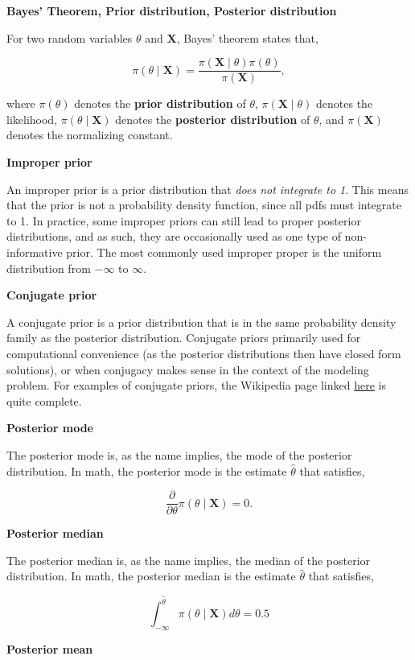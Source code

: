 \documentclass[
  letterpaper,
  DIV=11,
  numbers=noendperiod]{scrreprt}
\begin{document}
\textbf{Bayes' Theorem, Prior distribution, Posterior distribution}

For two random variables \(\theta\) and \(\textbf{X}\), Bayes' theorem
states that,

\[
\pi(\theta \mid \textbf{X}) = \frac{\pi(\textbf{X} \mid \theta)\pi(\theta)}{\pi(\textbf{X})},
\]

where \(\pi(\theta)\) denotes the \textbf{prior distribution} of
\(\theta\), \(\pi(\textbf{X} \mid \theta)\) denotes the likelihood,
\(\pi(\theta \mid \textbf{X})\) denotes the \textbf{posterior
distribution} of \(\theta\), and \(\pi(\textbf{X})\) denotes the
normalizing constant.

\textbf{Improper prior}

An improper prior is a prior distribution that \emph{does not integrate
to 1}. This means that the prior is not a probability density function,
since all pdfs must integrate to 1. In practice, some improper priors
can still lead to proper posterior distributions, and as such, they are
occasionally used as one type of non-informative prior. The most
commonly used improper proper is the uniform distribution from
\(-\infty\) to \(\infty\).

\textbf{Conjugate prior}

A conjugate prior is a prior distribution that is in the same
probability density family as the posterior distribution. Conjugate
priors primarily used for computational convenience (as the posterior
distributions then have closed form solutions), or when conjugacy makes
sense in the context of the modeling problem. For examples of conjugate
priors, the Wikipedia page linked
\href{https://en.wikipedia.org/wiki/Conjugate_prior}{here} is quite
complete.

\textbf{Posterior mode}

The posterior mode is, as the name implies, the mode of the posterior
distribution. In math, the posterior mode is the estimate
\(\hat{\theta}\) that satisfies,

\[
\frac{\partial}{\partial \theta}\pi(\theta \mid \textbf{X}) = 0.
\]

\textbf{Posterior median}

The posterior median is, as the name implies, the median of the
posterior distribution. In math, the posterior median is the estimate
\(\hat{\theta}\) that satisfies,

\[
\int_{-\infty}^{\hat{\theta}} \pi(\theta \mid \textbf{X}) d\theta = 0.5
\]

\textbf{Posterior mean}
\end{document}
